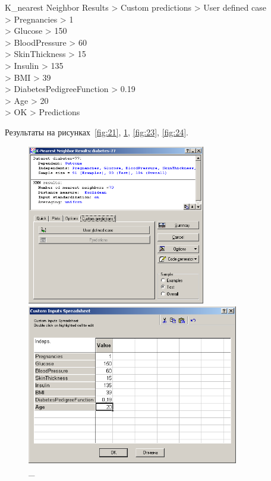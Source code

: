K\_nearest Neighbor Results > Custom predictions > User defined case \\
> Pregnancies > 1 \\
> Glucose > 150 \\
> BloodPressure > 60 \\
> SkinThickness > 15 \\
> Insulin > 135 \\
> BMI > 39 \\
> DiabetesPedigreeFunction > 0.19 \\
> Age > 20 \\
> OK > Predictions

Результаты на рисунках~\ref{fig:21}, \ref{fig:22}, \ref{fig:23}, \ref{fig:24}.

\begin{figure}[!h]
  \centering

  \begin{minipage}{0.49\textwidth}
    \centering

    \includegraphics[height=7cm]
    {inc/v5_28.PNG}

    \caption{\_}

    \label{fig:21}
  \end{minipage}
  \begin{minipage}{0.49\textwidth}
    \centering

    \includegraphics[height=7cm]
    {inc/v5_29.PNG}

    \caption{\_}

    \label{fig:22}
  \end{minipage}
\end{figure}

